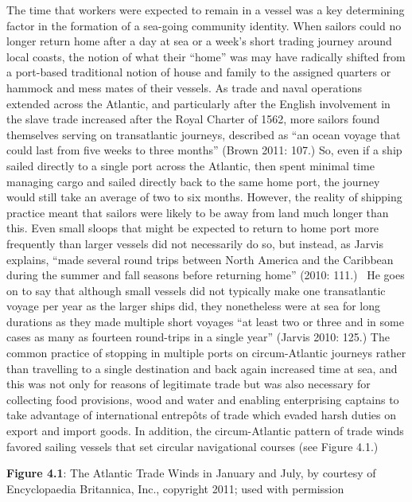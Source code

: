 \documentclass[12pt]{article}
\newenvironment{styleStandard}{\renewcommand\baselinestretch{1.0}\setlength\leftskip{0cm}\setlength\rightskip{0cm plus 1fil}\setlength\parindent{0cm}\setlength\parfillskip{0pt plus 1fil}\setlength\parskip{0in plus 1pt}\writerlistparindent\writerlistleftskip\leavevmode\normalfont\normalsize\writerlistlabel\ignorespaces}{\unskip\vspace{0in plus 1pt}\par}
\newcommand\writerlistleftskip{}
\newcommand\writerlistparindent{}
\newcommand\writerlistlabel{}
\begin{document}
\begin{styleStandard}
The time that workers were expected to remain in a vessel was a key determining factor in the formation of a sea-going community identity. When sailors could no longer return home after a day at sea or a week’s short trading journey around local coasts, the notion of what their “home” was may have radically shifted from a port-based traditional notion of house and family to the assigned quarters or hammock and mess mates of their vessels. As trade and naval operations extended across the Atlantic, and particularly after the English involvement in the slave trade increased after the Royal Charter of 1562, more sailors found themselves serving on transatlantic journeys, described as “an ocean voyage that could last from five weeks to three months” (Brown 2011: 107.) So, even if a ship sailed directly to a single port across the Atlantic, then spent minimal time managing cargo and sailed directly back to the same home port, the journey would still take an average of two to six months. However, the reality of shipping practice meant that sailors were likely to be away from land much longer than this. Even small sloops that might be expected to return to home port more frequently than larger vessels did not necessarily do so, but instead, as Jarvis explains, “made several round trips between North America and the Caribbean during the summer and fall seasons before returning home” (2010: 111.) \ He goes on to say that although small vessels did not typically make one transatlantic voyage per year as the larger ships did, they nonetheless were at sea for long durations as they made multiple short voyages “at least two or three and in some cases as many as fourteen round-trips in a single year” (Jarvis 2010: 125.) The common practice of stopping in multiple ports on circum-Atlantic journeys rather than travelling to a single destination and back again increased time at sea, and this was not only for reasons of legitimate trade but was also necessary for collecting food provisions, wood and water and enabling enterprising captains to take advantage of international entrepôts of trade which evaded harsh duties on export and import goods. In addition, the circum-Atlantic pattern of trade winds favored sailing vessels that set circular navigational courses (see Figure 4.1.) 
\end{styleStandard}


\begin{styleStandard}
\textbf{Figure 4.1}: The Atlantic Trade Winds in January and July, by courtesy of Encyclopaedia Britannica, Inc., copyright 2011; used with permission
\end{styleStandard}
\end{document}
